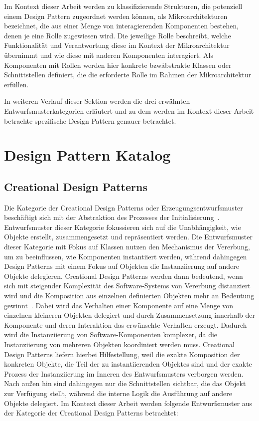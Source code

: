 Im Kontext dieser Arbeit werden zu klassifizierende Strukturen, die potenziell einem Design Pattern zugeordnet werden können, als Mikroarchitekturen bezeichnet, die aus einer Menge von interagierenden Komponenten bestehen, denen je eine Rolle zugewiesen wird. Die jeweilige Rolle beschreibt, welche Funktionalität und Verantwortung diese im Kontext der Mikroarchitektur übernimmt und wie diese mit anderen Komponenten interagiert.
Als Komponenten mit Rollen werden hier konkrete bzw\. abstrakte Klassen oder Schnittstellen definiert, die die erforderte Rolle im Rahmen der Mikroarchitektur erfüllen.

In weiteren Verlauf dieser Sektion werden die drei erwähnten Entwurfsmusterkategorien erläutert und zu dem werden im Kontext dieser Arbeit betrachte spezifische Design Pattern genauer betrachtet.

\newpage

\section{Design Pattern Katalog}

\subsection*{Creational Design Patterns}

Die Kategorie der Creational Design Patterns oder Erzeugungsentwurfsmuster beschäftigt sich mit der Abstraktion des Prozesses der Initialisierung~\cite[S. 81]{gamma1994design}. Entwurfsmuster dieser Kategorie fokussieren sich auf die Unabhängigkeit, wie Objekte erstellt, zusammengesetzt und repräsentiert werden.
Die Entwurfsmuster dieser Kategorie mit Fokus auf Klassen nutzen den Mechanismus der Vererbung, um zu beeinflussen, wie Komponenten instantiiert werden, während dahingegen Design Patterns mit einem Fokus auf Objekten die Instanziierung auf andere Objekte delegieren.
Creational Design Patterns werden dann bedeutend, wenn sich mit steigender Komplexität des Software-Systems von Vererbung distanziert wird und die Komposition aus einzelnen definierten Objekten mehr an Bedeutung gewinnt~\cite[S. 81]{gamma1994design}. Dabei wird das Verhalten einer Komponente auf eine Menge von einzelnen kleineren Objekten delegiert und durch Zusammensetzung innerhalb der Komponente und deren Interaktion das erwünschte Verhalten erzeugt.
Dadurch wird die Instanziierung von Software-Komponenten komplexer, da die Instanziierung von mehreren Objekten koordiniert werden muss. Creational Design Patterns liefern hierbei Hilfestellung, weil die exakte Komposition der konkreten Objekte, die Teil der zu instantiierenden Objektes sind und der exakte Prozess der Instanziierung im Inneren des Entwurfsmusters verborgen werden. Nach außen hin sind dahingegen nur die Schnittstellen sichtbar, die das Objekt zur Verfügung stellt, während die interne Logik die Ausführung auf andere Objekte delegiert.
Im Kontext dieser Arbeit werden folgende Entwurfsmuster aus der Kategorie der Creational Design Patterns betrachtet:

